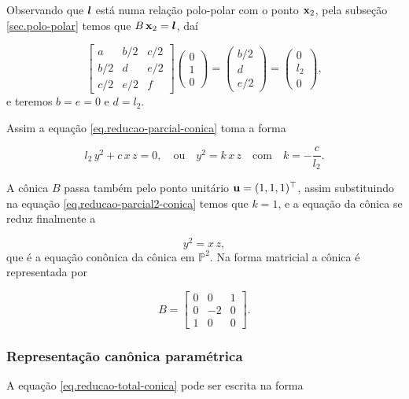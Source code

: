 Observando que $\boldsymbol{l}$ está numa relação polo-polar com o ponto $\mathbf{x}_2$, pela subseção \ref{sec.polo-polar} temos que $B\,\mathbf{x}_2=\boldsymbol{l}$, daí

\begin{equation*}
\begin{bmatrix}
a&b/2&c/2\\
b/2&d&e/2\\
c/2&e/2&f
\end{bmatrix}
\begin{pmatrix}
0\\
1\\
0
\end{pmatrix}
=
\begin{pmatrix}
b/2\\
d\\
e/2
\end{pmatrix}
=
\begin{pmatrix}
0\\
l_2\\
0
\end{pmatrix},
\end{equation*}
e teremos $b=e=0$ e $d=l_2$.

Assim a equação \ref{eq.reducao-parcial-conica} toma a forma

\begin{equation}\label{eq.reducao-parcial2-conica}
l_2\,y^2+c\,x\,z=0,\quad\text{ou}\quad y^2=k\,x\,z\quad\text{com}\quad k=-\frac{c}{l_2}.
\end{equation}

A cônica $B$ passa também pelo ponto unitário ${\bf u}=(1,1,1)^\top$, assim substituindo na equação \ref{eq.reducao-parcial2-conica} temos que $k=1$, e a equação da cônica se reduz finalmente a 

\begin{equation}\label{eq.reducao-total-conica}
y^2=x\,z,
\end{equation}
que é a equação conônica da cônica em $\mathbb{P}^2$. Na forma matricial a cônica é representada por 

\begin{equation*}
B=
\begin{bmatrix}
0&0&1\\
0&-2&0\\
1&0&0
\end{bmatrix}.
\end{equation*}

\subsubsection{Representação canônica paramétrica}\label{sec.repre-canonica-parametrica}
A equação \ref{eq.reducao-total-conica} pode ser escrita na forma 

